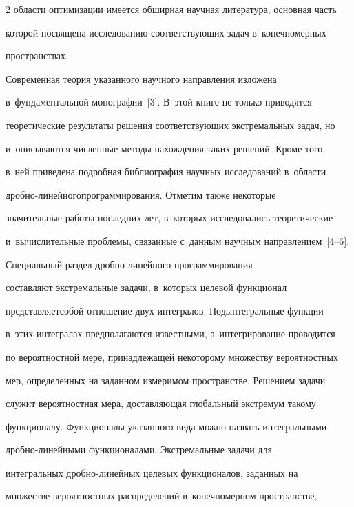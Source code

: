 \begin{multicols}{2}
об\-ласти оптимизации имеется обширная научная литература, основная часть 

которой посвящена исследованию соответствующих задач в~конечномерных 

пространствах.

     

     Современная теория указанного научного на\-прав\-ле\-ния изложена 

в~фундаментальной монографии~[3]. В~этой книге не только приводятся 

теоретические результаты решения со\-от\-вет\-ст\-ву\-ющих экстремальных задач, но 

и~описываются чис\-лен\-ные методы нахождения таких решений. Кроме того, 

в~ней приведена подробная библиография научных исследований в~области 

дроб\-но-ли\-ней\-но\-го\linebreak программирования. Отметим также некоторые\linebreak 

значительные работы по\-след\-них лет, в~которых исследовались теоретические 

и~вы\-чис\-ли\-тель\-ные проб\-ле\-мы, связанные с~данным научным на\-прав\-ле\-ни\-ем~[4--6].

     

     Специальный раздел дроб\-но-ли\-ней\-но\-го программирования 

со\-став\-ля\-ют экстремальные задачи, в~которых целевой функционал 

пред\-став\-ля\-ет\linebreak собой отношение двух интегралов. Подынтегральные функции 

в~этих интегралах предполагаются известными, а~интегрирование проводится 

по вероятностной мере, принадлежащей некоторому множеству вероятностных 

мер, определенных на заданном измеримом пространстве. Решением задачи 

служит вероятностная мера, до\-став\-ля\-ющая глобальный экстремум такому 

функ\-ци\-о\-на\-лу. Функционалы указанного вида можно назвать интегральными 

дроб\-но-ли\-ней\-ны\-ми функционалами. Экстремальные задачи для 

интегральных дроб\-но-ли\-ней\-ных целевых функционалов, заданных на 

множестве вероятностных распределений в~конечномерном про\-стран\-ст\-ве, 


\end{multicols}
